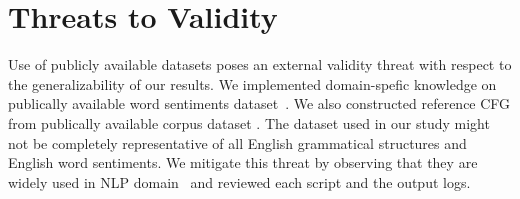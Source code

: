 \section{Threats to Validity}
\label{sec:threats}

Use of publicly available datasets poses an external validity threat
with respect to the generalizability of our results. We implemented
domain-spefic knowledge on publically available word sentiments
dataset~\cite{baccianella2010sentiwordnet}. We also constructed
reference CFG from publically available corpus dataset
\cite{mitchell1993treebank, nltkTreebankCorporaWebPage}. The dataset
used in our study might not be completely representative of all
English grammatical structures and English word sentiments. We
mitigate this threat by observing that they are widely used in NLP
domain~\cite{husnain2021swnvalidity} and reviewed each script and the
output logs.

